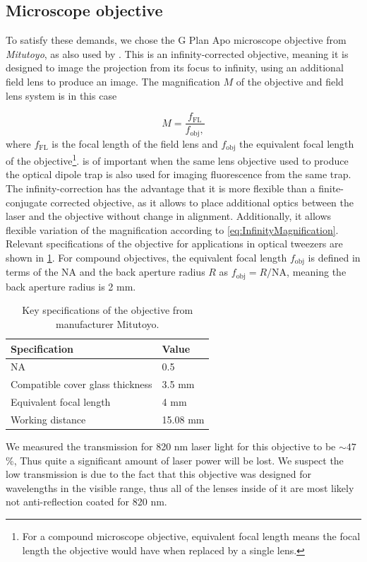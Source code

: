 \subsection{Microscope objective}

To satisfy these demands, we chose the G Plan Apo microscope objective from \textit{Mitutoyo}, as also used by \cite{Ebadi2021,Manuel2016}. 
This is an infinity-corrected objective, meaning it is designed to image the projection from its focus to infinity, using an additional field lens to produce an image.
The magnification $M$ of the objective and field lens system is in this case 

\begin{equation}\label{eq:InfinityMagnification}
	M = \frac{
		f_{\text{FL}}
	}{
		f_{\text{obj}},
	}
\end{equation}
where $f_{\text{FL}}$ is the focal length of the field lens and $f_{\text{obj}}$ the equivalent focal length of the objective\footnote{For a compound microscope objective, equivalent focal length means the focal length the objective would have when replaced by a single lens.}.
 is of important when the same lens objective used to produce the optical dipole trap is also used for imaging fluorescence from the same trap.
The infinity-correction has the advantage that it is more flexible than a finite-conjugate corrected objective, as it allows to place additional optics between the laser and the objective without change in alignment.
Additionally, it allows flexible variation of the magnification according to \cref{eq:InfinityMagnification}.
Relevant specifications of the objective for applications in optical tweezers are shown in \cref{table:MitutoyoSpecs}. 
For compound objectives, the equivalent focal length $f_{\text{obj}}$ is defined in terms of the \ac{NA} and the back aperture radius $R$ as $f_{\text{obj}} = R / \text{NA}$, meaning the back aperture radius is 2 mm.

\begin{table}[h]
	\centering
	\caption{Key specifications of the objective from manufacturer Mitutoyo.}
	\label{table:MitutoyoSpecs}
	\begin{tabular}{l  l}
		\textbf{Specification}          & \textbf{Value} \\ \hline \hline
		NA                              & 0.5            \\ 
		Compatible cover glass thickness& 3.5 mm         \\ 
		Equivalent focal length         & 4 mm           \\ 
		Working distance                & 15.08 mm      
	\end{tabular}
\end{table}
\noindent We measured the transmission for 820 nm laser light for this objective to be $\sim 47$\%, 
Thus quite a significant amount of laser power will be lost. 
We suspect the low transmission is due to the fact that this objective was designed for wavelengths in the visible range, thus all of the lenses inside of it are most likely not anti-reflection coated for 820 nm.

